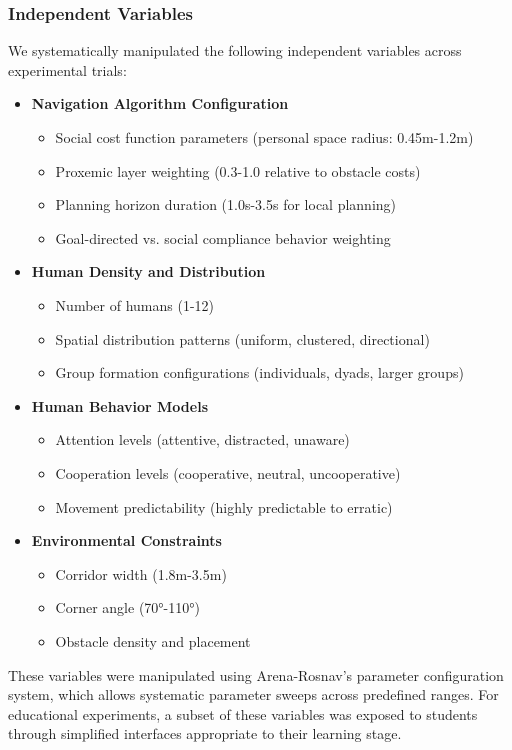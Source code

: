 \subsubsection{Independent Variables}
\label{subsubsec:independent_variables}
We systematically manipulated the following independent variables across experimental trials:
\begin{itemize}
    \item \textbf{Navigation Algorithm Configuration}
    \begin{itemize}
        \item Social cost function parameters (personal space radius: 0.45m-1.2m)
        \item Proxemic layer weighting (0.3-1.0 relative to obstacle costs)
        \item Planning horizon duration (1.0s-3.5s for local planning)
        \item Goal-directed vs. social compliance behavior weighting
    \end{itemize}
    \item \textbf{Human Density and Distribution}
    \begin{itemize}
        \item Number of humans (1-12)
        \item Spatial distribution patterns (uniform, clustered, directional)
        \item Group formation configurations (individuals, dyads, larger groups)
    \end{itemize}
    \item \textbf{Human Behavior Models}
    \begin{itemize}
        \item Attention levels (attentive, distracted, unaware)
        \item Cooperation levels (cooperative, neutral, uncooperative)
        \item Movement predictability (highly predictable to erratic)
    \end{itemize}
    \item \textbf{Environmental Constraints}
    \begin{itemize}
        \item Corridor width (1.8m-3.5m)
        \item Corner angle (70°-110°)
        \item Obstacle density and placement
    \end{itemize}
\end{itemize}
These variables were manipulated using Arena-Rosnav's parameter configuration system, which 
allows systematic parameter sweeps across predefined ranges. For educational experiments, 
a subset of these variables was exposed to students through simplified interfaces appropriate 
to their learning stage.

